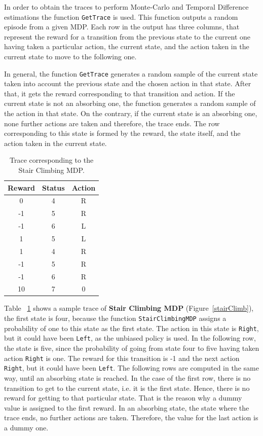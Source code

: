 \documentclass[10pt]{article}   	%
\begin{document}
In order to obtain the traces to perform Monte-Carlo and Temporal Difference estimations the function \texttt{GetTrace} is used. This function outputs a random episode from a given MDP. Each row in the output has three columns, that represent the reward for a transition from the previous state to the current one having taken a particular action, the current state, and the action taken in the current state to move to the following one.

In general, the function \texttt{GetTrace} generates a random sample of the current state taken into account the previous state and the chosen action in that state. After that, it gets the reward corresponding to that transition and action. If the current state is not an absorbing one, the function generates a random sample of the action in that state. On the contrary, if the current state is an absorbing one, none further actions are taken and therefore, the trace ends. The row corresponding to this state is formed by the reward, the state itself, and the action taken in the current state.

\begin{table}[!h] 
	\begin{center}
		\begin{tabular}{ | c c  c | }
		\hline
		Reward & Status & Action \\ \hline \hline
		0 & 4 & R \\ \hline
		-1 & 5 & R \\ \hline
		-1 & 6 & L \\ \hline
		1 & 5 & L \\ \hline
		1 & 4 & R \\ \hline
		-1 & 5 & R \\ \hline
		-1 & 6 & R \\ \hline
		10 & 7 & 0 \\ \hline
		\end{tabular}
		\caption{Trace corresponding to the Stair Climbing MDP.\label{tab:traceStair}}
		
	\end{center}
\end{table}

Table ~\ref{tab:traceStair} shows a sample trace of \textbf{Stair Climbing MDP} (Figure~\ref{stairClimb}), the first state is four, because the function \texttt{StairClimbingMDP} assigns a probability of one to this state as the first state. The action in this state is \texttt{Right}, but it could have been \texttt{Left}, as the unbiased policy is used. In the following row, the state is five, since the probability of going from state four to five having taken action \texttt{Right} is one. The reward for this transition is -1 and the next action \texttt{Right}, but it could have been \texttt{Left}. The following rows are computed in the same way, until an absorbing state is reached. In the case of the first row, there is no transition to get to the current state, i.e. it is the first state. Hence, there is no reward for getting to that particular state. That is the reason why a dummy value is assigned to the first reward. In an absorbing state, the state where the trace ends, no further actions are taken. Therefore, the value for the last action is a dummy one.
\end{document}
